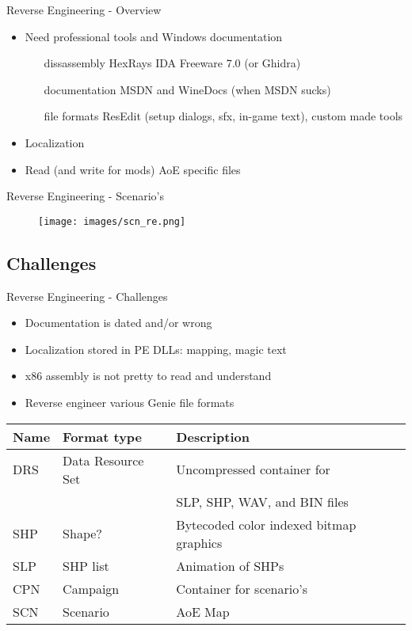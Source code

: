 \documentclass{beamer}
\begin{document}
\begin{frame}{Reverse Engineering - Overview}
	\begin{itemize}
		\item Need professional tools and Windows documentation
		\begin{itemize}
			\item[dissassembly] HexRays IDA Freeware 7.0 (or Ghidra)
			\item[documentation] MSDN and WineDocs (when MSDN sucks)
			\item[file formats] ResEdit (setup dialogs, sfx, in-game text), custom made tools
		\end{itemize}
		\item Localization
		\item Read (and write for mods) AoE specific files
	\end{itemize}
\end{frame}

\begin{frame}{Reverse Engineering - Scenario's}
	\begin{figure}
	\texttt{[image: images/scn\_re.png]}
	\end{figure}
\end{frame}


\subsection{Challenges}

\begin{frame}{Reverse Engineering - Challenges}
	\begin{itemize}
		\item Documentation is dated and/or wrong
		\item Localization stored in PE DLLs: mapping, magic text
		\item x86 assembly is not pretty to read and understand
		\item Reverse engineer various Genie file formats
	\end{itemize}

	\begin{tabular}{l|l|l}
	Name & Format type & Description \\ \hline
	DRS & Data Resource Set & Uncompressed container for \\
	& & SLP, SHP, WAV, and BIN files \\
	SHP & Shape? & Bytecoded color indexed bitmap graphics \\
	SLP & SHP list & Animation of SHPs \\
	CPN & Campaign & Container for scenario's \\
	SCN & Scenario & AoE Map
	\end{tabular}

\end{frame}
\end{document}
